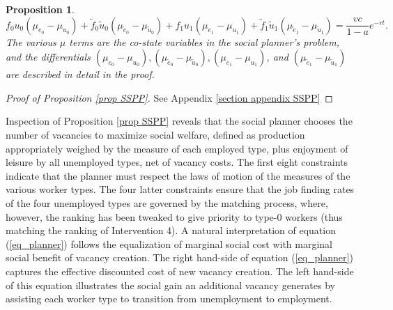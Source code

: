 \documentclass[12pt]{article} %
\newtheorem{proposition}{Proposition}
\theoremstyle{definition}
\begin{document}
\begin{proposition}
\begin{equation}
f_0u_0(\mu_{e_0}-\mu_{u_0}) + \tilde{f}_0\tilde{u}_0(\mu_{\tilde{e}_0}-\mu_{\tilde{u}_0}) +f_1u_1(\mu_{e_1}-\mu_{u_1})+\tilde{f}_1\tilde{u}_1(\mu_{\tilde{e}_1}-\mu_{\tilde{u}_1}) = \frac{vc}{1-a}e^{-rt}.\label{eq_planner}
\end{equation}
The various $\mu$ terms are the co-state variables in the social planner's problem, and the differentials $(\mu_{e_0}-\mu_{u_0}), (\mu_{\tilde{e}_0}-\mu_{\tilde{u}_0}), (\mu_{e_1}-\mu_{u_1})$, and $(\mu_{\tilde{e}_1}-\mu_{\tilde{u}_1})$ are described in detail in the proof.
\end{proposition}
\begin{proof}[Proof of Proposition \ref{prop SSPP}]
See Appendix \ref{section appendix SSPP}
\end{proof}
Inspection of Proposition \ref{prop SSPP} reveals that the social planner chooses the number of vacancies to maximize social welfare, defined as production appropriately weighed by the measure of each employed type, plus enjoyment of leisure by all unemployed types, net of vacancy costs. The first eight constraints indicate that the planner must respect the laws of motion of the measures of the various worker types. The four latter constraints ensure that the 
job finding rates of the four unemployed types are governed by the \cite{petrongolo2001looking} matching process, where, however, the ranking has been tweaked to give priority to type-0 workers (thus matching the ranking of Intervention 4). A natural interpretation of equation (\ref{eq_planner}) follows the equalization of marginal social cost with marginal social benefit of vacancy creation.
The right hand-side of equation (\ref{eq_planner}) captures the effective discounted cost of new vacancy creation.
The left hand-side of this equation illustrates the social gain an additional vacancy generates by assisting each worker type to transition from unemployment to employment.
\end{document}
